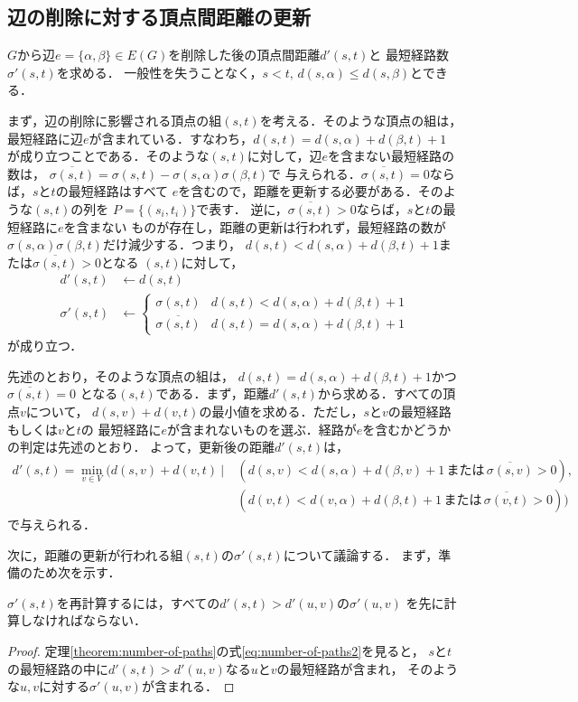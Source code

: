 \subsection{辺の削除に対する頂点間距離の更新}
\label{subsect:update-lower-bound-of-diameter}
$G$から辺$e=\{\alpha,\beta\}\in E(G)$を削除した後の頂点間距離$d'(s,t)$と
最短経路数$\sigma'(s,t)$を求める．
一般性を失うことなく，$s<t,\,d(s,\alpha)\leq d(s,\beta)$とできる．

まず，辺の削除に影響される頂点の組$(s,t)$を考える．そのような頂点の組は，
最短経路に辺$e$が含まれている．すなわち，$d(s,t) = d(s,\alpha)+d(\beta,t)+1$
が成り立つことである．そのような$(s,t)$に対して，辺$e$を含まない最短経路の数は，
$\overline{\sigma(s,t)}=\sigma(s,t)-\sigma(s,\alpha)\sigma(\beta,t)$で
与えられる．$\overline{\sigma(s,t)}=0$ならば，$s$と$t$の最短経路はすべて
$e$を含むので，距離を更新する必要がある．そのような$(s,t)$の列を
$P=\{(s_i,t_i)\}$で表す．
逆に，$\overline{\sigma(s,t)}>0$ならば，$s$と$t$の最短経路に$e$を含まない
ものが存在し，距離の更新は行われず，最短経路の数が
$\sigma(s,\alpha)\sigma(\beta,t)$だけ減少する．つまり，
$d(s,t)<d(s,\alpha)+d(\beta,t)+1$または$\overline{\sigma(s,t)}>0$となる
$(s,t)$に対して，
\begin{align*}
  d'(s,t) &\gets d(s,t) \\
  \sigma'(s,t) &\gets
  \begin{cases}
    \sigma(s,t) & d(s,t) < d(s,\alpha) + d(\beta,t) + 1 \\
    \overline{\sigma(s,t)} & d(s,t) = d(s,\alpha) + d(\beta,t) + 1
  \end{cases}
\end{align*}
が成り立つ．

先述のとおり，そのような頂点の組は，
$d(s,t)=d(s,\alpha)+d(\beta,t)+1$かつ$\overline{\sigma(s,t)}=0$
となる$(s,t)$である．まず，距離$d'(s,t)$から求める．すべての頂点$v$について，
$d(s,v)+d(v,t)$の最小値を求める．ただし，$s$と$v$の最短経路もしくは$v$と$t$の
最短経路に$e$が含まれないものを選ぶ．経路が$e$を含むかどうかの判定は先述のとおり．
よって，更新後の距離$d'(s,t)$は，
\begin{align*}
  d'(s,t) = \min_{v\in V}(d(s,v)+d(v,t)\:|\:
  &(d(s,v)<d(s,\alpha)+d(\beta,v)+1\,または\,\overline{\sigma(s,v)}>0),\\
  &(d(v,t)<d(v,\alpha)+d(\beta,t)+1\,または\,\overline{\sigma(v,t)}>0))
\end{align*}
で与えられる．

次に，距離の更新が行われる組$(s,t)$の$\sigma'(s,t)$について議論する．
まず，準備のため次を示す．
\begin{collary}
  $\sigma'(s,t)$を再計算するには，すべての$d'(s,t)>d'(u,v)$の$\sigma'(u,v)$
  を先に計算しなければならない．
\end{collary}
\begin{proof}
  定理\ref{theorem:number-of-paths}の式\ref{eq:number-of-paths2}を見ると，
  $s$と$t$の最短経路の中に$d'(s,t)>d'(u,v)$なる$u$と$v$の最短経路が含まれ，
  そのような$u,v$に対する$\sigma'(u,v)$が含まれる．
\end{proof}

